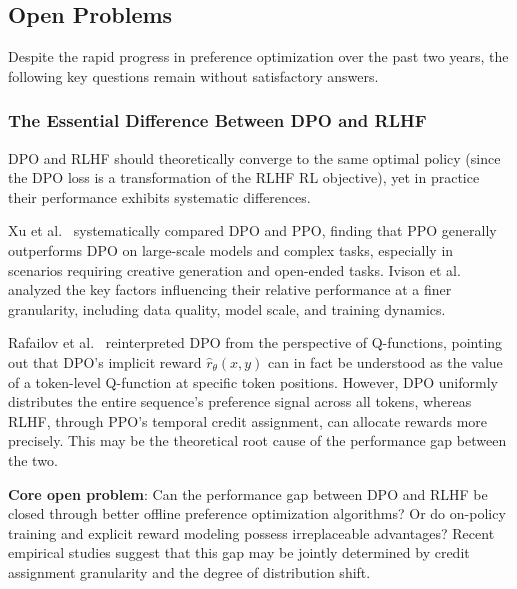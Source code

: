 \subsection{Open Problems}
\label{sec:t2-open}

Despite the rapid progress in preference optimization over the past two years,
the following key questions remain without satisfactory answers.

\subsubsection{The Essential Difference Between DPO and RLHF}
\label{sec:t2-dpo-vs-rlhf}

DPO and RLHF should theoretically converge to the same optimal policy
(since the DPO loss is a transformation of the RLHF RL objective),
yet in practice their performance exhibits systematic differences.

Xu et al.\ \cite{xu2024dposuperior} systematically compared DPO and PPO,
finding that PPO generally outperforms DPO on large-scale models and complex tasks,
especially in scenarios requiring creative generation and open-ended tasks.
Ivison et al.\ \cite{ivison2024unpacking} analyzed the key factors
influencing their relative performance at a finer granularity,
including data quality, model scale, and training dynamics.

Rafailov et al.\ \cite{rafailov2024rtoq} reinterpreted DPO from the perspective of Q-functions,
pointing out that DPO's implicit reward $\hat{r}_\theta(x, y)$ can in fact
be understood as the value of a token-level Q-function at specific token positions.
However, DPO uniformly distributes the entire sequence's preference signal across all tokens,
whereas RLHF, through PPO's temporal credit assignment, can allocate rewards more precisely.
This may be the theoretical root cause of the performance gap between the two.

\begin{openproblembox}
\textbf{Core open problem}: Can the performance gap between DPO and RLHF be closed through better
offline preference optimization algorithms?
Or do on-policy training and explicit reward modeling possess irreplaceable advantages?
Recent empirical studies \cite{performance2025gap} suggest
that this gap may be jointly determined by credit assignment granularity and the degree of distribution shift.
\end{openproblembox}

